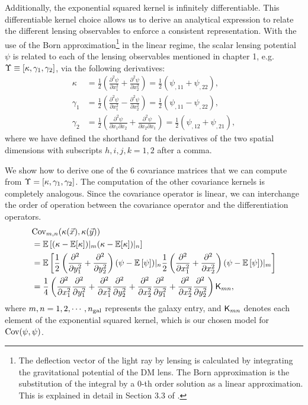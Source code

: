 Additionally, the exponential squared kernel is infinitely differentiable. This
differentiable kernel choice allows us to derive an analytical expression to
relate the different lensing observables to enforce a consistent representation.  
With the use of the Born approximation\footnote{The deflection vector of the light ray by
	lensing is calculated by integrating the gravitational potential of the DM
	lens.  
	The Born approximation is the substitution of the integral by a 0-th order
	solution as a linear approximation. 
	This is explained in detail in Section 3.3 of \citealt{Kilbinger2015}.} in the linear regime, 
the scalar lensing potential $\psi$ is related to 
each of the lensing observables mentioned in chapter 1, e.g. 
$\Upsilon \equiv [\kappa, \gamma_1, \gamma_2]$, via the following derivatives:
\begin{align}
\kappa &= \frac{1}{2}\left(\frac{\partial^2 \psi}{\partial x_1^2} +
\frac{\partial^2 \psi}{\partial x_2^2 }\right) 
= \frac{1}{2} (\psi_{,11} + \psi_{,22}),\\ 
\gamma_1 
&=\frac{1}{2}\left(\frac{\partial^2 \psi}{\partial x_1^2} - 
\frac{\partial^2 \psi}{\partial x_2^2}\right) 
= \frac{1}{2} (\psi_{,11} - \psi_{,22}), \\
\gamma_2 
&=\frac{1}{2}\left(\frac{\partial^2 \psi}{\partial x_1 \partial
x_2} + \frac{\partial^2 \psi}{\partial x_2 \partial x_1}\right)
= \frac{1}{2} (\psi_{,12} + \psi_{,21}),
\end{align}
where we have defined the shorthand for the derivatives of the two spatial dimensions with
subscripts $h,i,j,k = 1, 2$ after a comma.

We show how to derive one of the 6  covariance matrices that we can compute
from $\Upsilon = [\kappa, \gamma_1, \gamma_2]$. The computation of the other
covariance kernels is completely analogous.
Since the covariance operator is linear, we can interchange the order of
operation between the covariance operator and the differentiation operators. 
\begin{align*}
&{\rm Cov}_{m,n} (\kappa(\vec{x}), \kappa(\vec{y}))  \\ 
&= \mathbb{E} \left[ 
	(\kappa - \mathbb{E}[\kappa])|_m 
( \kappa - \mathbb{E}[\kappa])|_n\right] 
\\
 &=\mathbb{E}\left[
\frac{1}{2} \left(\frac{\partial^2}{\partial y_1^2} + 
\frac{\partial^2}{\partial y_2^2}\right) 
 (\psi - \mathbb{E}\left[\psi\right])|_n \frac{1}{2}
\left(\frac{\partial^2}{\partial x_1^2} + \frac{\partial^2}{\partial x_2^2} \right)
(\psi - \mathbb{E}\left[\psi\right])|_m \right]
\\
&= \frac{1}{4}\left(
\frac{\partial^2}{\partial x_1^2} \frac{\partial^2}{\partial y_1^2} + 
\frac{\partial^2}{\partial x_1^2} \frac{\partial^2}{\partial y_2^2} +  
\frac{\partial^2}{\partial x_2^2} \frac{\partial^2}{\partial y_1^2} + 
\frac{\partial^2}{\partial x_2^2} \frac{\partial^2}{\partial y_2^2}  
\right) \mathsf{K}_{mn},\\ 
\end{align*}
where $m, n = 1, 2, \cdots, n_{\rm gal}$ represents the galaxy entry, and  
$\mathsf{K}_{mn}$ denotes each element of the exponential squared kernel,
which is our chosen model for $\mathrm{Cov}(\psi, \psi)$.

